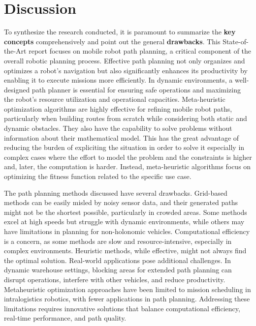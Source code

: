 \section{Discussion} %
To synthesize the research conducted, it is paramount to summarize the \textbf{key concepts} comprehensively and 
point out the general \textbf{drawbacks}. This 
State-of-the-Art report focuses on mobile robot path planning, a critical component of the overall 
robotic planning process. Effective path planning not only organizes and optimizes a robot's navigation 
but also significantly enhances its productivity by enabling it to execute missions more efficiently. 
In dynamic environments, a well-designed path planner is essential for ensuring safe operations and 
maximizing the robot's resource utilization and operational capacities.
Meta-heuristic optimization algorithms are highly effective for refining mobile robot paths, particularly 
when building routes from scratch while considering both static and dynamic obstacles.
They also have the capability to solve problems without information about their mathematical model.
This has the great advantage of reducing the burden of expliciting the situation in order to solve it especially 
in complex cases where the effort to model the problem and the constraints is higher and, later, the computation 
is harder. Instead, meta-heuristic algorithms focus on optimizing the fitness function related to the specific 
use case. 

The path planning methods discussed have several drawbacks. Grid-based methods can be easily misled by noisy 
sensor data, and their generated paths might not be the shortest possible, particularly in crowded areas. 
Some methods excel at high speeds but struggle with dynamic environments, while others may have limitations 
in planning for non-holonomic vehicles. Computational efficiency is a concern, as some methods are slow and 
resource-intensive, especially in complex environments. Heuristic methods, while effective, might not always 
find the optimal solution. Real-world applications pose additional challenges. In dynamic warehouse settings, 
blocking areas for extended path planning can disrupt operations, interfere with other vehicles, and reduce 
productivity. Metaheuristic optimization approaches have been limited to mission scheduling in intralogistics 
robotics, with fewer applications in path planning. Addressing these limitations requires innovative solutions 
that balance computational efficiency, real-time performance, and path quality.

